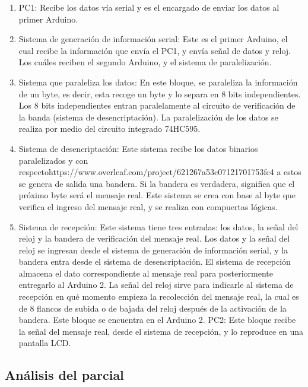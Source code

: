 \documentclass{article}
\begin{document}
\begin{enumerate}
\item PC1: Recibe los datos vía serial y es el encargado de enviar los datos al primer Arduino.

\item Sistema de generación de información serial:  Este es el primer Arduino, el cual recibe la información que envía el PC1, y envía señal de datos y reloj. Los cuáles reciben el segundo Arduino, y el sistema de paralelización.

\item Sistema que paraleliza los datos:  En este bloque, se paraleliza la información de un byte, es decir, esta recoge un byte y lo separa en 8 bits independientes. Los 8 bits independientes entran paralelamente al circuito de verificación de la banda (sistema de desencriptación). La paralelización de los datos se realiza por medio del circuito integrado 74HC595.

\item Sistema de desencriptación: Este sistema recibe los datos binarios paralelizados y con respectohttps://www.overleaf.com/project/621267a53c07121701753fc4 a estos se genera de salida una bandera. Si la bandera es verdadera, significa que el próximo byte será el mensaje real. Este sistema se crea con base al byte que verifica el ingreso del mensaje real, y se realiza con compuertas lógicas.

\item Sistema de recepción: Este sistema tiene tres entradas: los datos, la señal del reloj y la bandera de verificación del mensaje real. Los datos y la señal del reloj se ingresan desde el sistema de generación de información serial, y la bandera entra desde el sistema de desencriptación. El sistema de recepción almacena el dato correspondiente al mensaje real para posteriormente entregarlo al Arduino 2. La señal del reloj sirve para indicarle al sistema de recepción en qué momento empieza la recolección del mensaje real, la cual es de 8 flancos de subida o de bajada del reloj después de la activación de la bandera. Este bloque se encuentra en el Arduino 2.
PC2: Este bloque recibe la señal del mensaje real, desde el sistema de recepción, y lo reproduce en una pantalla LCD.

\end{enumerate}


\subsection{Análisis del parcial}
	
\end{document}
